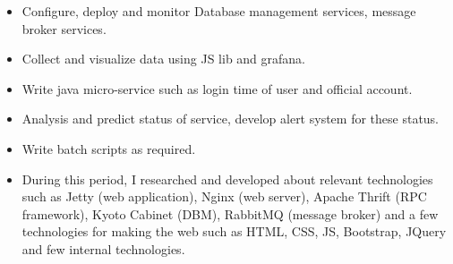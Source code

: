 \documentclass[10pt,a4paper,ragged2e]{altacv}
\begin{document}
\begin{paracol}{2}

\begin{itemize}
\item Configure, deploy and monitor Database management services, message broker services.
\item Collect and visualize data using JS lib and grafana.
\item Write java micro-service such as login time of user and official account.
\item Analysis and predict status of service, develop alert system for these status.
\item Write batch scripts as required.
\end{itemize}

\divider

\begin{itemize}
\item During this period, I researched and developed about relevant technologies such as Jetty (web application), Nginx (web server), Apache Thrift (RPC framework), Kyoto Cabinet (DBM), RabbitMQ (message broker) and a few technologies for making the web such as HTML, CSS, JS, Bootstrap, JQuery and few internal technologies.
\end{itemize}






\end{paracol}
\end{document}
